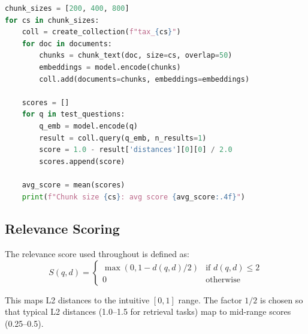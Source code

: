 \documentclass[11pt,a4paper]{article}
\begin{document}
\begin{lstlisting}[language=Python, caption={Ablation study loop}]
chunk_sizes = [200, 400, 800]
for cs in chunk_sizes:
    coll = create_collection(f"tax_{cs}")
    for doc in documents:
        chunks = chunk_text(doc, size=cs, overlap=50)
        embeddings = model.encode(chunks)
        coll.add(documents=chunks, embeddings=embeddings)
    
    scores = []
    for q in test_questions:
        q_emb = model.encode(q)
        result = coll.query(q_emb, n_results=1)
        score = 1.0 - result['distances'][0][0] / 2.0
        scores.append(score)
    
    avg_score = mean(scores)
    print(f"Chunk size {cs}: avg score {avg_score:.4f}")
\end{lstlisting}

\subsection{Relevance Scoring}

The relevance score used throughout is defined as:
\[
S(q, d) = \begin{cases}
\max(0, 1 - d(q,d)/2) & \text{if } d(q,d) \leq 2 \\
0 & \text{otherwise}
\end{cases}
\]

This maps L2 distances to the intuitive $[0, 1]$ range. The factor $1/2$ is chosen so that typical L2 distances (1.0--1.5 for retrieval tasks) map to mid-range scores (0.25--0.5).
\end{document}
